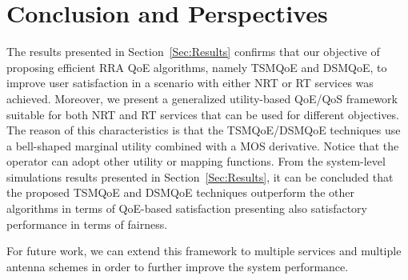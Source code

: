 \documentclass[12pt]{article}
\newcommand{\FigRef}[1]{Figure~\ref{#1}}
\newcommand{\SecRef}[1]{Section~\ref{#1}}
\begin{document}

\section{Conclusion and Perspectives}
\label{Sec:conclusion}
The results presented in \SecRef{Sec:Results} confirms that our objective of proposing efficient \ac{RRA} QoE algorithms, namely TSMQoE and DSMQoE, to improve user satisfaction in a scenario with either NRT or RT services was achieved. Moreover, we present a generalized utility-based QoE/QoS framework suitable for both NRT and RT services that can be used  for different objectives. The reason of this characteristics is that the TSMQoE/DSMQoE techniques use a bell-shaped marginal utility combined with a MOS derivative. Notice that the operator can adopt other utility or mapping functions.
From the system-level simulations results presented in \SecRef{Sec:Results}, it can be concluded that the proposed TSMQoE and DSMQoE techniques outperform the other algorithms in terms of QoE-based satisfaction presenting also satisfactory performance in terms of fairness.

For future work, we can extend this framework to multiple services and multiple antenna schemes in order to further improve the system performance.
\end{document}
